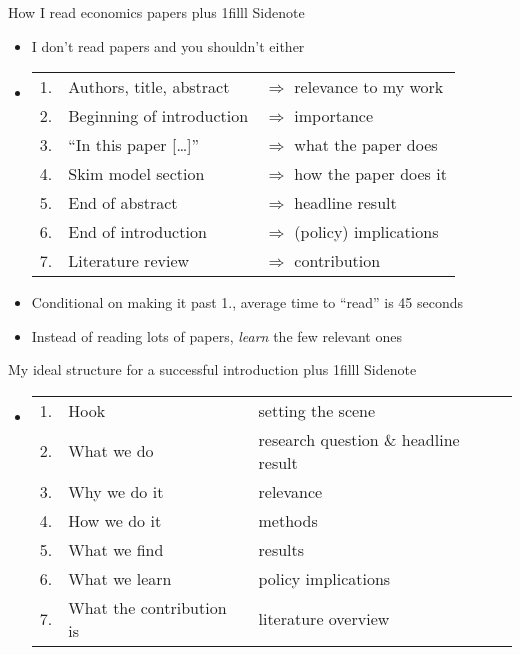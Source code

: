\documentclass[aspectratio=169,compress,t,xcolor=table]{beamer}
\newcommand{\myhfill}[1]{\hskip0pt plus 1filll {\small #1}}
\begin{document}
{
\begin{frame}{How I read economics papers \myhfill{Sidenote}}
  \begin{itemize}
    \vfill\item I don't read papers and you shouldn't either

    \pause
    \vfill\item 
    \begin{center}
      \begin{tabular}{cll}
        \color{MyStructure} 1. & Authors, title, abstract & \(\Rightarrow\) relevance to my work \\[0.5em]
        \color{MyStructure} 2. & Beginning of introduction & \(\Rightarrow\) importance \\[0.5em]
        \color{MyStructure} 3. & ``In this paper [\ldots]'' & \(\Rightarrow\) what the paper does \\[0.5em]
        \color{MyStructure} 4. & Skim model section & \(\Rightarrow\) how the paper does it \\[0.5em]
        \color{MyStructure} 5. & End of abstract & \(\Rightarrow\) headline result \\[0.5em]
        \color{MyStructure} 6. & End of introduction & \(\Rightarrow\) (policy) implications \\[0.5em]
        \color{MyStructure} 7. & Literature review & \(\Rightarrow\) contribution
      \end{tabular}
    \end{center}

    \vfill\item Conditional on making it past 1., average time to ``read'' is 45 seconds
    \vfill\item Instead of reading lots of papers, \textit{learn} the few relevant ones
  \end{itemize}
\end{frame}

\begin{frame}{My ideal structure for a successful introduction \myhfill{Sidenote}}
  \begin{itemize}
    \vfill\item
    \begin{center}
      \begin{tabular}{cll}
        \color{MyStructure} 1. & Hook & setting the scene \\[0.5em]
        \color{MyStructure} 2. & What we do & research question \& headline result \\[0.5em]
        \color{MyStructure} 3. & Why we do it & relevance \\[0.5em]
        \color{MyStructure} 4. & How we do it & methods \\[0.5em]
        \color{MyStructure} 5. & What we find & results \\[0.5em]
        \color{MyStructure} 6. & What we learn & policy implications \\[0.5em]
        \color{MyStructure} 7. & What the contribution is & literature overview
      \end{tabular}
    \end{center}


\end{itemize}
\end{frame}}
\end{document}
